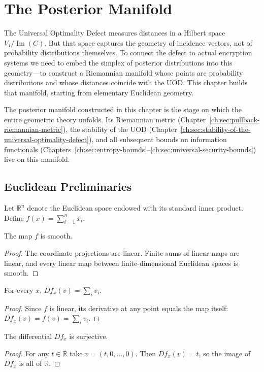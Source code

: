 \chapter[Posterior Manifold]{The Posterior Manifold}\label{ch:sec:the-posterior-manifold}

The Universal Optimality Defect measures distances in a Hilbert space
$V_I/\operatorname{Im}(C)$.  But that space captures the geometry of
incidence vectors, not of probability distributions themselves.
To connect the defect to actual encryption systems we need to embed the
simplex of posterior distributions into this geometry---to construct a
Riemannian manifold whose points are probability distributions and whose
distances coincide with the UOD.  This chapter builds that manifold,
starting from elementary Euclidean geometry.


The posterior manifold constructed in this chapter is the stage on which the entire geometric theory unfolds. Its Riemannian metric (Chapter~\ref{ch:sec:pullback-riemannian-metric}), the stability of the UOD (Chapter~\ref{ch:sec:stability-of-the-universal-optimality-defect}), and all subsequent bounds on information functionals (Chapters~\ref{ch:sec:entropy-bounds}--\ref{ch:sec:universal-security-bounds}) live on this manifold.

\section{Euclidean Preliminaries}\label{ch:sec:euclidean-preliminaries}
Let \(\mathbb{R}^{n}\) denote the Euclidean space endowed with its
standard inner product.
Define
$f(x)=\sum_{i=1}^{n} x_i.$
\begin{proposition}
\label{ch:prop:1-1}
The map \(f\) is smooth.
\end{proposition}
\begin{proof} The coordinate projections are linear. Finite sums of linear
maps are linear, and every linear map between finite-dimensional
Euclidean spaces is smooth. 
\end{proof}
\begin{proposition}
\label{ch:prop:1-2}
For every \(x\),
$Df_x(v)=\sum_i v_i.$
\end{proposition}
\begin{proof} Since \(f\) is linear, its derivative at any point equals
the map itself: \(Df_x(v)=f(v)=\sum_i v_i\).
\end{proof}
\begin{proposition}[Surjectivity]
\label{ch:prop:1-3}
The differential \(Df_x\) is surjective.
\end{proposition}
\begin{proof} For any \(t\in\mathbb R\) take \(v=(t,0,\dots,0)\).
Then \(Df_x(v)=t\), so the image of \(Df_x\) is all of \(\mathbb R\).
\end{proof}
